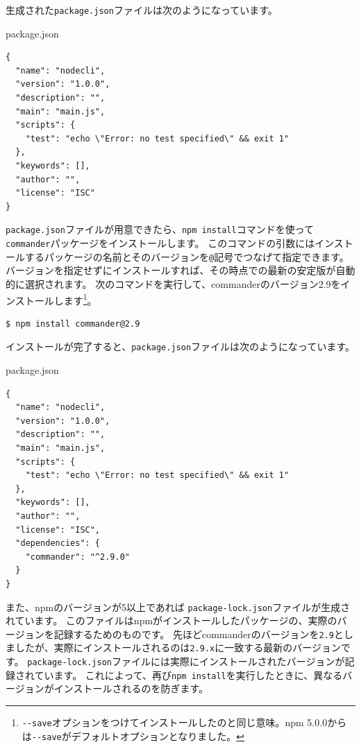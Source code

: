 生成された\texttt{package.json}ファイルは次のようになっています。

\begin{listtitle}
package.json
\end{listtitle}
\begin{lstlisting}
{
  "name": "nodecli",
  "version": "1.0.0",
  "description": "",
  "main": "main.js",
  "scripts": {
    "test": "echo \"Error: no test specified\" && exit 1"
  },
  "keywords": [],
  "author": "",
  "license": "ISC"
}
\end{lstlisting}
\listend

\texttt{package.json}ファイルが用意できたら、\texttt{npm install}コマンドを使って\texttt{commander}パッケージをインストールします。
このコマンドの引数にはインストールするパッケージの名前とそのバージョンを\texttt{@}記号でつなげて指定できます。
バージョンを指定せずにインストールすれば、その時点での最新の安定版が自動的に選択されます。
次のコマンドを実行して、commanderのバージョン2.9をインストールします\footnote{\texttt{-\/-save}オプションをつけてインストールしたのと同じ意味。npm
  5.0.0からは\texttt{-\/-save}がデフォルトオプションとなりました。}。

\begin{lstlisting}
$ npm install commander@2.9
\end{lstlisting}

インストールが完了すると、\texttt{package.json}ファイルは次のようになっています。

\begin{listtitle}
package.json
\end{listtitle}
\begin{lstlisting}
{
  "name": "nodecli",
  "version": "1.0.0",
  "description": "",
  "main": "main.js",
  "scripts": {
    "test": "echo \"Error: no test specified\" && exit 1"
  },
  "keywords": [],
  "author": "",
  "license": "ISC",
  "dependencies": {
    "commander": "^2.9.0"
  }
}
\end{lstlisting}
\listend

また、npmのバージョンが5以上であれば
\texttt{package-lock.json}ファイルが生成されています。
このファイルはnpmがインストールしたパッケージの、実際のバージョンを記録するためのものです。
先ほどcommanderのバージョンを\texttt{2.9}としましたが、実際にインストールされるのは\texttt{2.9.x}に一致する最新のバージョンです。
\texttt{package-lock.json}ファイルには実際にインストールされたバージョンが記録されています。
これによって、再び\texttt{npm install}を実行したときに、異なるバージョンがインストールされるのを防ぎます。


